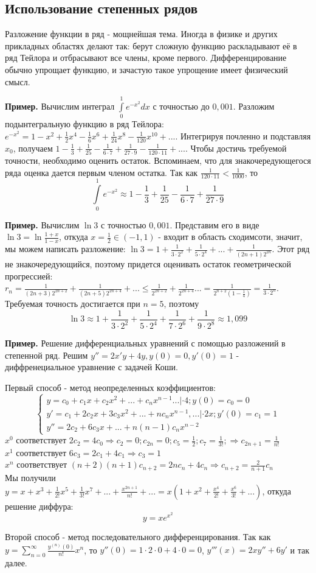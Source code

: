 \subsection{Использование степенных рядов}
Разложение функции в ряд - мощнейшая тема. Иногда в физике и других прикладных
областях делают так: берут сложную функцию раскладывают её в ряд Тейлора и 
отбрасывают все члены, кроме первого. Дифференцирование обычно упрощает 
функцию, и зачастую такое упрощение имеет физический смысл. 

\textbf{Пример.} Вычислим интеграл
$\int\limits_{0}^{1}e^{-x^2}dx$ с точностью до $0,001$. 
Разложим подынтегральную функцию в ряд Тейлора:
$e^{-x^2}=1-x^2+\frac{1}{2}x^4-\frac{1}{6}x^6+\frac{1}{24}x^8-
\frac{1}{120}x^{10}+...$. Интегрируя почленно и подставляя $x_0$, получаем 
$1-\frac{1}{3}+\frac{1}{25}-\frac{1}{6\cdot 7}+\frac{1}{27\cdot 9}-
\frac{1}{120\cdot 11}+...$. Чтобы достичь требуемой точности, необходимо
оценить остаток. Вспоминаем, что для знакочередующегося ряда оценка
дается первым членом остатка. Так как $\frac{1}{120\cdot 11}<\frac{1}{1000}$,
то $$\int\limits_{0}^{1}e^{-x^2}\approx
1-\frac{1}{3}+\frac{1}{25}-\frac{1}{6\cdot 7}+\frac{1}{27\cdot 9}$$

\textbf{Пример.} Вычислим $\ln3$ с точностью $0,001$. Представим его в виде
 $\ln3=\ln\frac{1+x}{1-x}$, откуда $x=\frac{1}{2}\in(-1,1)$ - входит
 в область сходимсоти, значит, мы можем написать разложение: 
 $\ln{3}=1+\frac{1}{3\cdot 2^2}+\frac{1}{5\cdot 2^4}+...+
 \frac{1}{(2n+1)2^{2n}}$. Этот ряд не знакочередующийся, поэтому
 придется оценивать остаток геометрической прогрессией:
 $r_n=\frac{1}{(2n+3)2^{2n+2}}+\frac{1}{(2n+5)2^{2n+4}}+...\leqslant 
 \frac{1}{2^{2n+2}}+\frac{1}{2^{2n+4}}...=\frac{1}{2^{n+2}(1-\frac{1}{4})}=
 \frac{1}{3\cdot 2^n}$. Требуемая точность достигается при $n=5$, поэтому
$$\ln 3\approx 1+\frac{1}{3\cdot 2^2}+\frac{1}{5\cdot 2^4}+
\frac{1}{7\cdot 2^6}+\frac{1}{9\cdot 2^8}\approx 1,099$$

\textbf{Пример.} Решение дифференциальных уравнений с помощью разложений в 
степенной ряд. Решим $y'' = 2x'y + 4y, y(0) = 0 , y'(0)=1$ -
диффренециальное уравнение с задачей Коши. 

Первый способ - метод неопределенных коэффициентов:
$$\begin{cases}
y = c_0 + c_1x + c_2x^2 + ... + c_nx^{n-1} ... |\cdot  4; y(0) = c_0 = 0\\
y' = c_1 + 2c_2x + 3c_3x^2+...+nc_nx^{n-1}, ... |\cdot  2x; y'(0)=c_1=1\\
y'' = 2c_2 + 6c_3x + ... + n(n-1)c_nx^{n-2}
\end{cases}$$
$x^0$ соответствует $2c_2=4c_0 \Rightarrow c_2 = 0; c_{2n} = 0; c_5 = 
\frac{1}{2};
c_7 = \frac{1}{3!}; \Rightarrow c_{2n+1} = \frac{1}{n!}$\\
$x^1$ соответствует $6c_3 = 2c_1 + 4 c_1 \Rightarrow c_3 = 1$\\
$x^n$ соответствует $(n+2)(n+1)c_{n+2} = 2nc_n + 4c_n \Rightarrow c_{n+2} = 
\frac{2}{n+1}c_n$\\
Мы получили 
$y = x + x^3 + \frac{1}{2!}x^5 + \frac{1}{3!}x^7 + ... + \frac{x^{2n+1}}{n!}
+ ... = x(1+x^2+\frac{x^4}{2!} + \frac{x^6}{3!}+...)$,
откуда решение диффура: 
$$y = xe^{x^2}$$

Второй способ - метод последовательного дифференцирования. 
Так как $y=\sum\limits_{n=0}^{\infty} \frac{y^{(n)}(0)}{n!}x^n$, 
то $y''(0)=1\cdot 2\cdot 0+4\cdot 0=0$, $y'''(x)=2xy''+6y'$ и так далее. 


